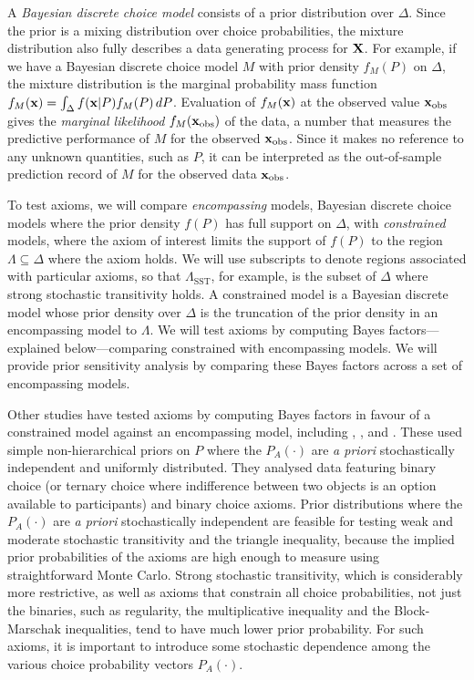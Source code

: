 \documentclass[11pt,letter]{article}
\begin{document}
A {\em Bayesian discrete choice model} consists of a prior distribution over $\Delta$.
Since the prior is a mixing distribution over choice probabilities, the mixture distribution also fully describes a data generating process for ${\bf X}$.
For example, if we have a Bayesian discrete choice model $M$ with prior density $f_M(P)$ on $\Delta$, the mixture distribution is the marginal probability mass function $f_M({\bf x}) = \int_\Delta f({\bf x}|P) f_M(P) \,dP$.
Evaluation of $f_M({\bf x})$ at the observed value ${\bf x}_{\mathrm{obs}}$ gives the {\em marginal likelihood} $f_M({\bf x}_{\mathrm{obs}})$ of the data, a number that measures the predictive performance of $M$ for the observed ${\bf x}_{\mathrm{obs}}$.
Since it makes no reference to any unknown quantities, such as $P$, it can be interpreted as the out-of-sample prediction record of $M$ for the observed data ${\bf x}_{\mathrm{obs}}$.

To test axioms, we will compare {\em encompassing} models, Bayesian discrete choice models where the prior density $f(P)$ has full support on $\Delta$, with {\em constrained} models, where the axiom of interest limits the support of $f(P)$ to the region $\Lambda \subseteq \Delta$ where the axiom holds.
We will use subscripts to denote regions associated with particular axioms, so that $\Lambda_{\mathrm{SST}}$, for example, is the subset of $\Delta$ where strong stochastic transitivity holds.
A constrained model is a Bayesian discrete model whose prior density over $\Delta$ is the truncation of the prior density in an encompassing model to $\Lambda$.
We will test axioms by computing Bayes factors---explained below---comparing constrained with encompassing models.
We will provide prior sensitivity analysis by comparing these Bayes factors across a set of encompassing models.

Other studies have tested axioms by computing Bayes factors in favour of a constrained model against an encompassing model, including , ,  and .
These used simple non-hierarchical priors on $P$ where the $P_A(\cdot)$ are {\em a priori} stochastically independent and uniformly distributed.
They analysed data featuring binary choice (or ternary choice where indifference between two objects is an option available to participants) and binary choice axioms.
Prior distributions where the $P_A(\cdot)$ are {\em a priori} stochastically independent are feasible for testing weak and moderate stochastic transitivity and the triangle inequality, because the implied prior probabilities of the axioms are high enough to measure using straightforward Monte Carlo.
Strong stochastic transitivity, which is considerably more restrictive, as well as axioms that constrain all choice probabilities, not just the binaries, such as regularity, the multiplicative inequality and the Block-Marschak inequalities, tend to have much lower prior probability.
For such axioms, it is important to introduce some stochastic dependence among the various choice probability vectors $P_A(\cdot)$.
\end{document}
